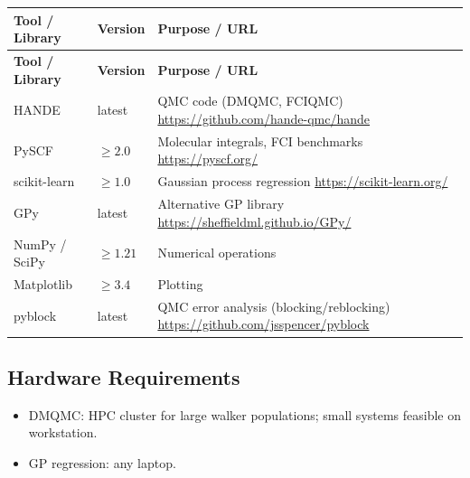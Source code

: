 \documentclass[11pt,a4paper]{article}
\begin{document}
\begin{longtable}{p{4.5cm} p{2.5cm} p{6.5cm}}
\toprule
\textbf{Tool / Library} & \textbf{Version} & \textbf{Purpose / URL} \\
\midrule
\endfirsthead
\toprule
\textbf{Tool / Library} & \textbf{Version} & \textbf{Purpose / URL} \\
\midrule
\endhead
HANDE & latest & QMC code (DMQMC, FCIQMC) \newline \url{https://github.com/hande-qmc/hande} \\
\midrule
PySCF & $\geq 2.0$ & Molecular integrals, FCI benchmarks \newline \url{https://pyscf.org/} \\
\midrule
scikit-learn & $\geq 1.0$ & Gaussian process regression \newline \url{https://scikit-learn.org/} \\
\midrule
GPy & latest & Alternative GP library \newline \url{https://sheffieldml.github.io/GPy/} \\
\midrule
NumPy / SciPy & $\geq 1.21$ & Numerical operations \\
\midrule
Matplotlib & $\geq 3.4$ & Plotting \\
\midrule
pyblock & latest & QMC error analysis (blocking/reblocking) \newline \url{https://github.com/jsspencer/pyblock} \\
\bottomrule
\end{longtable}

\subsection{Hardware Requirements}
\begin{itemize}
  \item DMQMC: HPC cluster for large walker populations; small systems feasible on workstation.
  \item GP regression: any laptop.
\end{itemize}
\end{document}

